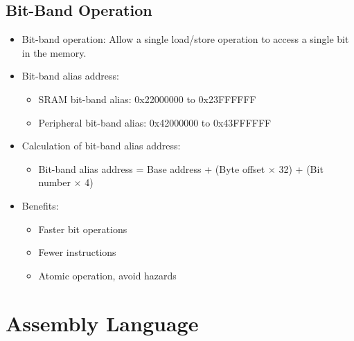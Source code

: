 \documentclass[a4paper,12pt,openany]{book}
\begin{document}
\section{Bit-Band Operation}
\begin{itemize}
    \item Bit-band operation: Allow a single load/store operation to access a single bit in the memory.
    \item Bit-band alias address:
    \begin{itemize}
        \item SRAM bit-band alias: 0x22000000 to 0x23FFFFFF
        \item Peripheral bit-band alias: 0x42000000 to 0x43FFFFFF
    \end{itemize}
    \item Calculation of bit-band alias address:
    \begin{itemize}
        \item Bit-band alias address = Base address + (Byte offset $\times$ 32) + (Bit number $\times$ 4)
    \end{itemize}
    \item Benefits:
    \begin{itemize}
        \item Faster bit operations
        \item Fewer instructions
        \item Atomic operation, avoid hazards
    \end{itemize}
\end{itemize}

\chapter{Assembly Language}
\end{document}
